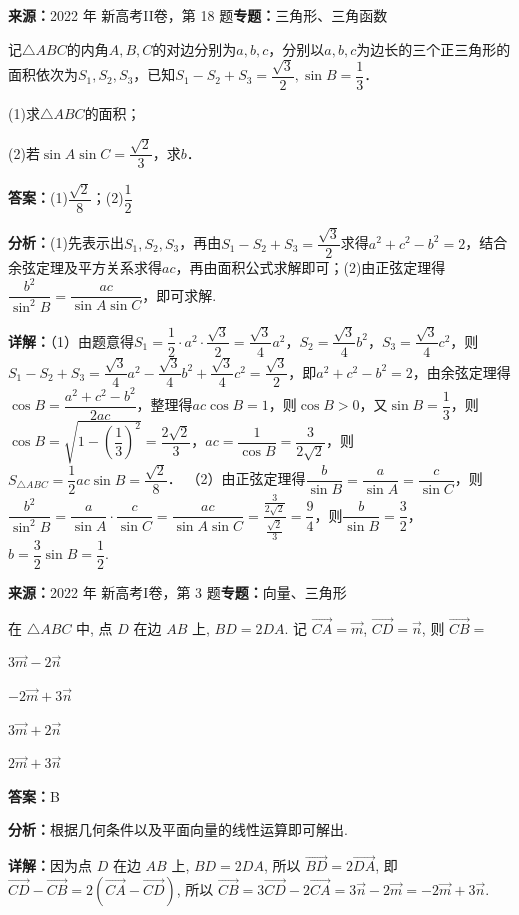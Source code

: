 \begin{question}[points=12]
\textbf{来源：}2022 年 新高考II卷，第 18 题\quad \textbf{专题：}三角形、三角函数\par
记$\triangle ABC$的内角$A,B,C$的对边分别为$a,b,c$，分别以$a,b,c$为边长的三个正三角形的面积依次为$S_1,S_2,S_3$，已知$S_1-S_2+S_3=\dfrac{\sqrt{3}}{2},\sin B=\dfrac{1}{3}$．

(1)求$\triangle ABC$的面积；

(2)若$\sin A\sin C=\dfrac{\sqrt{2}}{3}$，求$b$．
\begin{solution}
\textbf{答案：}(1)$\dfrac{\sqrt{2}}{8}$；(2)$\dfrac{1}{2}$

\textbf{分析：}(1)先表示出$S_1,S_2,S_3$，再由$S_1-S_2+S_3=\dfrac{\sqrt{3}}{2}$求得$a^2+c^2-b^2=2$，结合余弦定理及平方关系求得$ac$，再由面积公式求解即可；(2)由正弦定理得$\dfrac{b^2}{\sin^2 B}=\dfrac{ac}{\sin A\sin C}$，即可求解.

\textbf{详解：}（1）由题意得$S_1=\dfrac{1}{2}\cdot a^2\cdot\dfrac{\sqrt{3}}{2}=\dfrac{\sqrt{3}}{4}a^2$，$S_2=\dfrac{\sqrt{3}}{4}b^2$，$S_3=\dfrac{\sqrt{3}}{4}c^2$，则$S_1-S_2+S_3=\dfrac{\sqrt{3}}{4}a^2-\dfrac{\sqrt{3}}{4}b^2+\dfrac{\sqrt{3}}{4}c^2=\dfrac{\sqrt{3}}{2}$，即$a^2+c^2-b^2=2$，由余弦定理得$\cos B=\dfrac{a^2+c^2-b^2}{2ac}$，整理得$ac\cos B=1$，则$\cos B>0$，又$\sin B=\dfrac{1}{3}$，则$\cos B=\sqrt{1-\left(\dfrac{1}{3}\right)^2}=\dfrac{2\sqrt{2}}{3}$，$ac=\dfrac{1}{\cos B}=\dfrac{3}{2\sqrt{2}}$，则$S_{\triangle ABC}=\dfrac{1}{2}ac\sin B=\dfrac{\sqrt{2}}{8}$．
（2）由正弦定理得$\dfrac{b}{\sin B}=\dfrac{a}{\sin A}=\dfrac{c}{\sin C}$，则$\dfrac{b^2}{\sin^2 B}=\dfrac{a}{\sin A}\cdot\dfrac{c}{\sin C}=\dfrac{ac}{\sin A\sin C}=\dfrac{\frac{3}{2\sqrt{2}}}{\frac{\sqrt{2}}{3}}=\dfrac{9}{4}$，则$\dfrac{b}{\sin B}=\dfrac{3}{2}$，$b=\dfrac{3}{2}\sin B=\dfrac{1}{2}$.
\end{solution}
\end{question}

\begin{question}[points=5]
\textbf{来源：}2022 年 新高考I卷，第 3 题\quad \textbf{专题：}向量、三角形\par
在 $\triangle ABC$ 中, 点 $D$ 在边 $AB$ 上, $BD = 2DA$. 记 $\overrightarrow{CA} = \vec{m}$, $\overrightarrow{CD} = \vec{n}$, 则 $\overrightarrow{CB} =$
\begin{choices}
  \item $3\vec{m} - 2\vec{n}$
  \item $-2\vec{m} + 3\vec{n}$
  \item $3\vec{m} + 2\vec{n}$
  \item $2\vec{m} + 3\vec{n}$
\end{choices}
\begin{solution}
\textbf{答案：}B

\textbf{分析：}根据几何条件以及平面向量的线性运算即可解出.

\textbf{详解：}因为点 $D$ 在边 $AB$ 上, $BD = 2DA$, 所以 $\overrightarrow{BD} = 2\overrightarrow{DA}$, 即 $\overrightarrow{CD} - \overrightarrow{CB} = 2(\overrightarrow{CA} - \overrightarrow{CD})$, 所以 $\overrightarrow{CB} = 3\overrightarrow{CD} - 2\overrightarrow{CA} = 3\vec{n} - 2\vec{m} = -2\vec{m} + 3\vec{n}$.
\end{solution}
\end{question}

